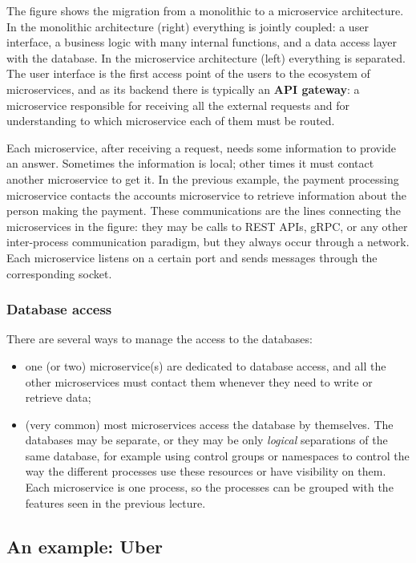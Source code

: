 The figure shows the migration from a monolithic to a microservice architecture. In the monolithic architecture (right) everything is jointly coupled: a user interface, a business logic with many internal functions, and a data access layer with the database. In the microservice architecture (left) everything is separated. The user interface is the first access point of the users to the ecosystem of microservices, and as its backend there is typically an \textbf{API gateway}: a microservice responsible for receiving all the external requests and for understanding to which microservice each of them must be routed.

Each microservice, after receiving a request, needs some information to provide an answer. Sometimes the information is local; other times it must contact another microservice to get it. In the previous example, the payment processing microservice contacts the accounts microservice to retrieve information about the person making the payment. These communications are the lines connecting the microservices in the figure: they may be calls to REST APIs, gRPC, or any other inter-process communication paradigm, but they always occur through a network. Each microservice listens on a certain port and sends messages through the corresponding socket.

\subsubsection*{Database access}

There are several ways to manage the access to the databases:

\begin{itemize}
\item one (or two) microservice(s) are dedicated to database access, and all the other microservices must contact them whenever they need to write or retrieve data;
\item (very common) most microservices access the database by themselves. The databases may be separate, or they may be only \emph{logical} separations of the same database, for example using control groups or namespaces to control the way the different processes use these resources or have visibility on them. Each microservice is one process, so the processes can be grouped with the features seen in the previous lecture.
\end{itemize}

\subsection{An example: Uber}

